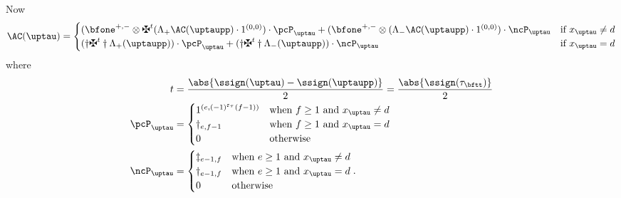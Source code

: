 \documentclass[ssunip]{subfiles}
\begin{document}
Now
\begin{equation}\label{eq:gd.ls}
  \oAC{\uptau} =
  \begin{cases}
    (\bfone^{+,-}\otimes \maltese^t (\Lambda_{+}\AC( \uptaupp )\cdot 1^{(0,0)}) \cdot \pcP_{\uptau}
    + (\bfone^{+,-}\otimes (\Lambda_{-}\AC( \uptaupp )\cdot 1^{(0,0)})  \cdot \ncP_{\uptau}
    & \text{if } x_{\uptau} \neq d\\
    (\dagger\maltese^t \dagger \pAC{\uptaupp}) \cdot \pcP_{\uptau}
    + (\dagger\maltese^{t} \dagger \nAC{\uptaupp})  \cdot \ncP_{\uptau}
    & \text{if } x_{\uptau} =d\\
  \end{cases}
\end{equation}
where
\[
  \begin{split}
    t & = \frac{\abs{\ssign(\uptau)-\ssign(\uptaupp)}}{2} = \frac{\abs{\ssign(\tau_{\bftt})}}{2}\\
    \pcP_{\uptau}& = \begin{cases} 1^{(e,(-1)^{\varepsilon_{\tau}}(f-1))} & \text{when
      } f\geq 1 \text{ and } x_{\uptau}\neq d \\
      \dagger_{e,f-1} & \text{when
      } f\geq 1 \text{ and } x_{\uptau}= d \\
      0 & \text{otherwise}
    \end{cases}\\
    \ncP_{\uptau}& = \begin{cases} \ddagger_{e-1,f} & \text{when
      } e\geq 1 \text{ and } x_{\uptau}\neq d \\
      \dagger_{e-1,f} & \text{when
      } e\geq 1 \text{ and } x_{\uptau}= d \\
      0 & \text{otherwise}
    \end{cases}.\\
  \end{split}
\]
%
\end{document}
